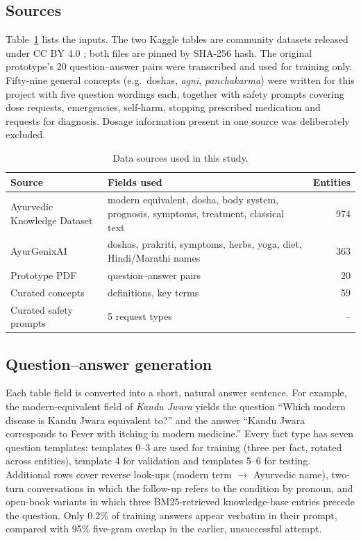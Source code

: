 \documentclass[5p,times,authoryear]{elsarticle}
\begin{document}
\subsection{Sources}
Table~\ref{tab:sources} lists the inputs. The two Kaggle tables are community datasets released under CC BY 4.0 \citep{kaggle_ak,kaggle_ag}; both files are pinned by SHA-256 hash. The original prototype's 20 question--answer pairs were transcribed and used for training only. Fifty-nine general concepts (e.g.\ doshas, \emph{agni}, \emph{panchakarma}) were written for this project with five question wordings each, together with safety prompts covering dose requests, emergencies, self-harm, stopping prescribed medication and requests for diagnosis. Dosage information present in one source was deliberately excluded.

\begin{table}[t]
\centering
\small
\caption{Data sources used in this study.}
\label{tab:sources}
\footnotesize
\begin{tabular}{@{}p{2.9cm}p{4.3cm}r@{}}
\toprule
Source & Fields used & Entities \\
\midrule
Ayurvedic Knowledge Dataset \citep{kaggle_ak} & modern equivalent, dosha, body system, prognosis, symptoms, treatment, classical text & 974 \\
AyurGenixAI \citep{kaggle_ag} & doshas, prakriti, symptoms, herbs, yoga, diet, Hindi/Marathi names & 363 \\
Prototype PDF \citep{acharyagpt2023} & question--answer pairs & 20 \\
Curated concepts & definitions, key terms & 59 \\
Curated safety prompts & 5 request types & -- \\
\bottomrule
\end{tabular}
\end{table}

\subsection{Question--answer generation}
Each table field is converted into a short, natural answer sentence. For example, the modern-equivalent field of \emph{Kandu Jwara} yields the question ``Which modern disease is Kandu Jwara equivalent to?'' and the answer ``Kandu Jwara corresponds to Fever with itching in modern medicine.'' Every fact type has seven question templates: templates 0--3 are used for training (three per fact, rotated across entities), template 4 for validation and templates 5--6 for testing. Additional rows cover reverse look-ups (modern term $\rightarrow$ Ayurvedic name), two-turn conversations in which the follow-up refers to the condition by pronoun, and open-book variants in which three BM25-retrieved knowledge-base entries precede the question. Only 0.2\% of training answers appear verbatim in their prompt, compared with 95\% five-gram overlap in the earlier, unsuccessful attempt.
\end{document}
